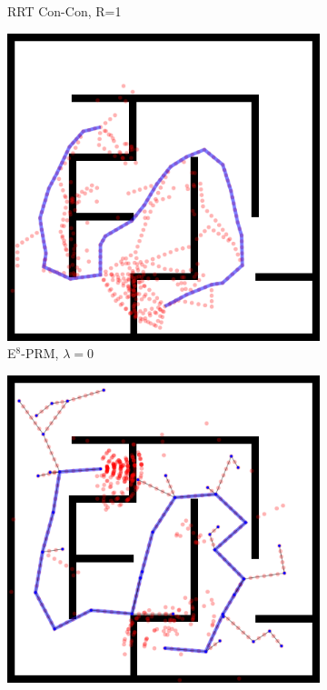 \begin{figure}
\begin{subfigure}[b]{0.3\textwidth}
      \caption{RRT Con-Con, R=1}
   \end{subfigure}%
   \quad
   \begin{subfigure}[b]{0.3\textwidth}
      \includegraphics[width=\textwidth]{figs/compare-2d-rrtc1-checkmask-l00-s1.png}
      \caption{E$^8$-PRM, $\lambda=0$}
   \end{subfigure}%
   \vspace{0.05in}
   \begin{subfigure}[b]{0.3\textwidth}
      \includegraphics[width=\textwidth]{figs/compare-2d-rrtc1-rrtextcon-r6-s1.png}

\end{subfigure}
\end{figure}
